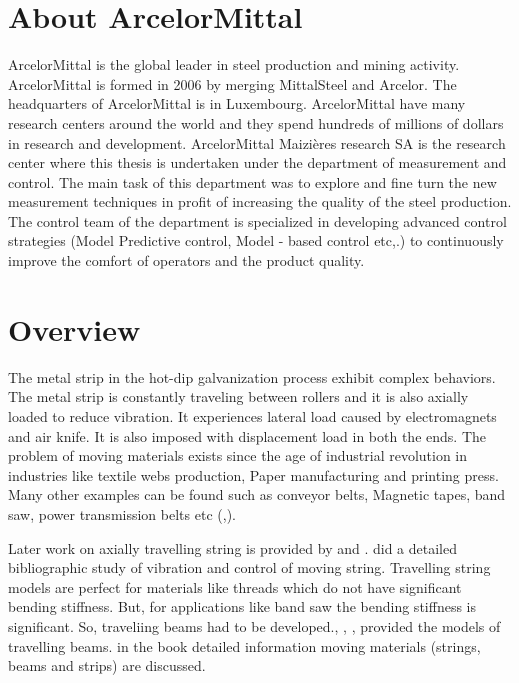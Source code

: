 \documentclass[main.tex]{subfiles}
\begin{document}
\section{About ArcelorMittal}
ArcelorMittal is the global leader in steel production and mining activity. ArcelorMittal is formed in 2006 by merging MittalSteel and Arcelor. The headquarters of ArcelorMittal is in Luxembourg. ArcelorMittal have many research centers around the world and they spend hundreds of millions of dollars in research and development. ArcelorMittal Maizières research SA is the research center where this thesis is undertaken under the department of measurement and control. The main task of this department was to explore and fine turn the new measurement techniques in profit of increasing the quality of the steel production. The control team of the department is specialized in developing advanced control strategies (Model Predictive control, Model - based control etc,.) to continuously improve the comfort of operators and the product quality.




\section{Overview}

The metal strip in the hot-dip galvanization process exhibit complex behaviors. The metal strip is constantly traveling between rollers and it is also axially loaded to reduce vibration. It experiences lateral load caused by electromagnets and air knife. It is also imposed with displacement load in both the ends. The problem of moving materials exists since the age of industrial revolution in industries like textile webs production, Paper manufacturing and printing press. Many other examples can be found such as conveyor belts, Magnetic tapes, band saw, power transmission belts etc (\cite{CHOI20021},\cite{Moving_sandwich}).

Later work on axially travelling string is provided by \cite{STEINBOECK2015598} and \cite{KOIVUROVA1999845}. \cite{string_biblio} did a detailed bibliographic study of vibration and control of moving string. Travelling string models are perfect for materials like threads which do not have significant bending stiffness. But, for applications like band saw the bending stiffness is significant. So, traveliing beams had to be developed.\cite{CHEN2006996}, \cite{CHANG20101482}, \cite{Moving_beam}, \cite{Moving_TIM_Beam} provided the models of travelling beams. \cite{BookDynmicMarynowiski2008} in the book detailed information moving materials (strings, beams and strips) are discussed. 
\end{document}
